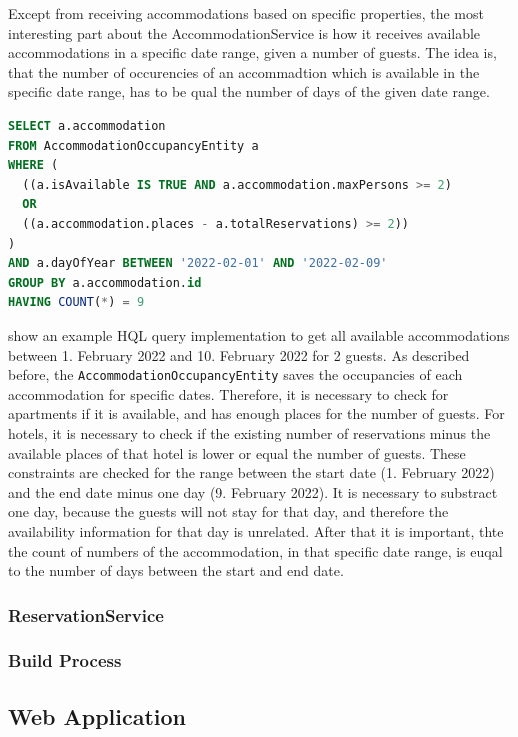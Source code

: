 Except from receiving accommodations based on specific properties, the most interesting part about the AccommodationService is how it receives available accommodations in a specific date range, given a number of guests.
The idea is, that the number of occurencies of an accommadtion which is available in the specific date range, has to be qual the number of days of the given date range.
\begin{lstlisting}[label=lst:02_impl_ejb_accommodation_sql, caption=Example of a HQL query to receive all available accommodations, language=sql]
SELECT a.accommodation
FROM AccommodationOccupancyEntity a
WHERE (
  ((a.isAvailable IS TRUE AND a.accommodation.maxPersons >= 2) 
  OR 
  ((a.accommodation.places - a.totalReservations) >= 2))
)
AND a.dayOfYear BETWEEN '2022-02-01' AND '2022-02-09'
GROUP BY a.accommodation.id
HAVING COUNT(*) = 9 
\end{lstlisting}
 show an example HQL query implementation to get all available accommodations between 1. February 2022 and 10. February 2022 for 2 guests.
As described before, the \texttt{AccommodationOccupancyEntity} saves the occupancies of each accommodation for specific dates. Therefore, it is necessary to check for apartments if it is available, and has enough places for the number of guests. For hotels, it is necessary to check if the existing number of reservations minus the available places of that hotel is lower or equal the number of guests.
These constraints are checked for the range between the start date (1. February 2022) and the end date minus one day (9. February 2022). It is necessary to substract one day, because the guests will not stay for that day, and therefore the availability information for that day is unrelated.
After that it is important, thte the count of numbers of the accommodation, in that specific date range, is euqal to the number of days between the start and end date.


\subsubsection{ReservationService}


\subsubsection{Build Process}


\subsection{Web Application}
